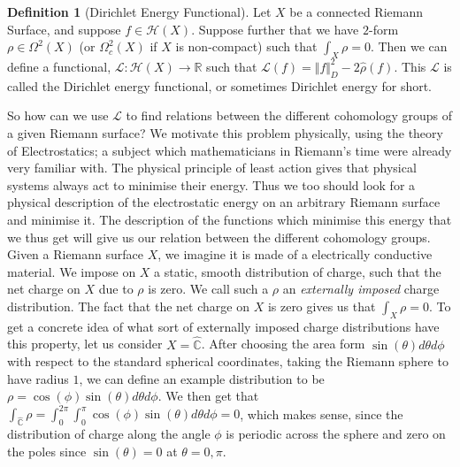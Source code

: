 \documentclass[11pt]{report}
\theoremstyle{definition}
\newtheorem{defn}[thm]{Definition}
\begin{document}
\begin{defn}[Dirichlet Energy Functional]
  Let $X$ be a connected Riemann Surface, and suppose $f \in \mathcal{H}(X)$. Suppose further that we have $2$-form $\rho \in \Omega^2 (X)$ (or $\Omega^2_c (X)$ if $X$ is non-compact) such that $\int_X \rho = 0$. Then we can define a functional, $\mathcal{L}: 
  \mathcal{H}(X) \rightarrow \mathbb{R}$ such that $\mathcal{L}(f) = \Vert f\Vert ^2_D - 2\hat{\rho}(f)$. This $\mathcal{L}$ is called the Dirichlet energy functional, or sometimes Dirichlet energy for short.
\end{defn}

So how can we use $\mathcal{L}$ to find relations between the different cohomology groups of a given Riemann surface? We motivate this problem physically, using the theory of Electrostatics; a subject which mathematicians in Riemann's time were already very familiar with. The physical principle of least action gives that physical systems always act to minimise their energy. Thus we too should look for a physical description of the electrostatic energy on an arbitrary Riemann surface and minimise it. The description of the functions which minimise this energy that we thus get will give us our relation between the different cohomology groups. Given a Riemann surface $X$, we imagine it is made of a electrically conductive material. We impose on $X$ a static, smooth distribution of charge, such that the net charge on $X$ due to $\rho$ is zero. We call such a $\rho$ an \emph{externally imposed} charge distribution. The fact that the net charge on $X$ is zero gives us that $\int_X \rho = 0$. To get a concrete idea of what sort of externally imposed charge distributions have this property, let us consider $X=\widehat{\mathbb{C}}$. After choosing the area form $\sin(\theta)d\theta d\phi$ with respect to the standard spherical coordinates, taking the Riemann sphere to have radius $1$, we can define an example distribution to be $\rho = \cos(\phi)\sin(\theta)d\theta d\phi$. We then get that $\int_{\widehat{\mathbb{C}}}\rho =\int_0^{2\pi}\int_0^{\pi}\cos(\phi)\sin(\theta)d\theta d\phi= 0$, which makes sense, since the distribution of charge along the angle $\phi$ is periodic across the sphere and zero on the poles since $\sin(\theta)=0$ at $\theta = 0,\pi$.
\end{document}
